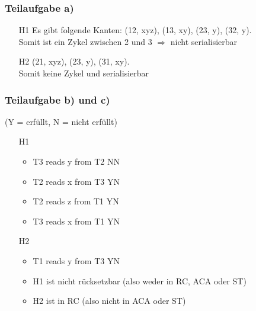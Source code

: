 \documentclass[a4paper,9pt]{scrartcl}
\begin{document}
\subsubsection{Teilaufgabe a)}
\begin{itemize}
\item[H1] Es gibt folgende Kanten:
    (12, xyz), (13, xy), (23, y), (32, y).\\
    Somit ist ein Zykel zwischen 2 und 3 $\Rightarrow$ nicht serialisierbar
\item[H2] (21, xyz), (23, y), (31, xy).\\
    Somit keine Zykel und serialisierbar
\end{itemize}

\subsubsection{Teilaufgabe b) und c)}
(Y = erfüllt, N = nicht erfüllt)
\begin{itemize}
\item[H1]
    \begin{itemize}
        \item T3 reads y from T2 NN
        \item T2 reads x from T3 YN
        \item T2 reads z from T1 YN
        \item T3 reads x from T1 YN
    \end{itemize}
\item[H2]
    \begin{itemize}
        \item T1 reads y from T3 YN
        \item H1 ist nicht rücksetzbar (also weder in RC, ACA oder ST)
        \item H2 ist in RC (also nicht in ACA oder ST)
    \end{itemize}
\end{itemize}
\end{document}
